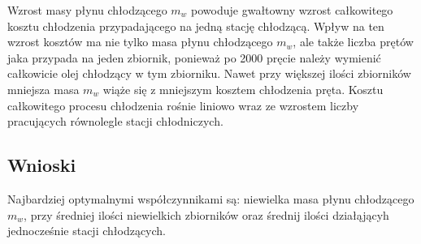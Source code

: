 \documentclass[
	12pt, %
]{fphw}
\begin{document}
Wzrost masy płynu chłodzącego \(m_w\) powoduje gwałtowny wzrost
całkowitego kosztu chłodzenia przypadającego na jedną stację chłodzącą.
Wpływ na ten wzrost kosztów ma nie tylko masa płynu chłodzącego \(m_w\),
ale także liczba prętów jaka przypada na jeden zbiornik, ponieważ
po 2000 pręcie należy wymienić całkowicie olej chłodzący w tym zbiorniku.
Nawet przy większej ilości zbiorników mniejsza masa \(m_w\) wiąże się z mniejszym
kosztem chłodzenia pręta.
Kosztu całkowitego procesu chłodzenia rośnie liniowo
wraz ze wzrostem liczby pracujących równolegle stacji chłodniczych.

\subsection{Wnioski}
Najbardziej optymalnymi współczynnikami są:
niewielka masa płynu chłodzącego \(m_w\),
przy średniej ilości niewielkich zbiorników
oraz średnij ilości działąjącyh jednocześnie stacji chłodzących.
\newpage

\listoftables
\lstlistoflistings
\listoffigures
\end{document}

